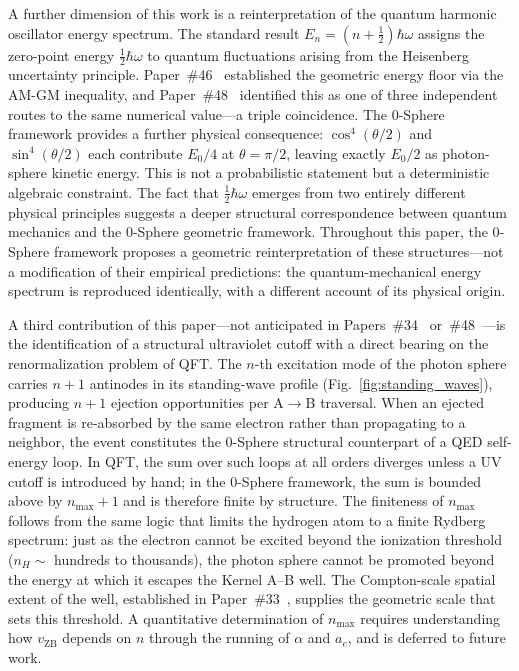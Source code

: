 \documentclass[%
 reprint, amsmath,amssymb, aps, prb, ]{revtex4-2}
\numberwithin{equation}{section}
\begin{document}
A further dimension of this work is a reinterpretation of the quantum harmonic oscillator energy spectrum. The standard result $E_n = (n + \tfrac{1}{2})\hbar\omega$ assigns the zero-point energy $\tfrac{1}{2}\hbar\omega$ to quantum fluctuations arising from the Heisenberg uncertainty principle. Paper~\#46~\cite{hanamura46} established the geometric energy floor via the AM-GM inequality, and Paper~\#48~\cite{hanamura48} identified this as one of three independent routes to the same numerical value---a triple coincidence. The 0-Sphere framework provides a further physical consequence: $\cos^4(\theta/2)$ and $\sin^4(\theta/2)$ each contribute $E_0/4$ at $\theta = \pi/2$, leaving exactly $E_0/2$ as photon-sphere kinetic energy. This is not a probabilistic statement but a deterministic algebraic constraint. The fact that $\tfrac{1}{2}\hbar\omega$ emerges from two entirely different physical principles suggests a deeper structural correspondence between quantum mechanics and the 0-Sphere geometric framework. Throughout this paper, the 0-Sphere framework proposes a geometric reinterpretation of these structures---not a modification of their empirical predictions: the quantum-mechanical energy spectrum is reproduced identically, with a different account of its physical origin.

A third contribution of this paper---not anticipated in Papers~\#34~\cite{hanamura34} or~\#48~\cite{hanamura48}---is the identification of a structural ultraviolet cutoff with a direct bearing on the renormalization problem of QFT. The $n$-th excitation mode of the photon sphere carries $n+1$ antinodes in its standing-wave profile (Fig.~\ref{fig:standing_waves}), producing $n+1$ ejection opportunities per A$\to$B traversal. When an ejected fragment is re-absorbed by the same electron rather than propagating to a neighbor, the event constitutes the 0-Sphere structural counterpart of a QED self-energy loop. In QFT, the sum over such loops at all orders diverges unless a UV cutoff is introduced by hand; in the 0-Sphere framework, the sum is bounded above by $n_{\max}+1$ and is therefore finite by structure. The finiteness of $n_{\max}$ follows from the same logic that limits the hydrogen atom to a finite Rydberg spectrum: just as the electron cannot be excited beyond the ionization threshold ($n_H \sim$ hundreds to thousands), the photon sphere cannot be promoted beyond the energy at which it escapes the Kernel A--B well. The Compton-scale spatial extent of the well, established in Paper~\#33~\cite{hanamura33}, supplies the geometric scale that sets this threshold. A quantitative determination of $n_{\max}$ requires understanding how $v_{\text{ZB}}$ depends on $n$ through the running of $\alpha$ and $a_e$, and is deferred to future work.
\end{document}

